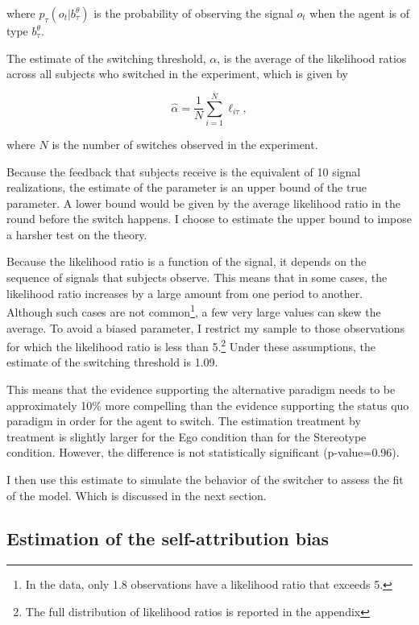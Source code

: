 \documentclass[
  12pt,
]{article}
\begin{document}
where \(p_\tau(o_t|b_{\tau}^\theta)\) is the probability of observing
the signal \(o_t\) when the agent is of type \(b_{\tau}^\theta\).

The estimate of the switching threshold, \(\alpha\), is the average of
the likelihood ratios across all subjects who switched in the
experiment, which is given by

\[\hat{\alpha} = \frac{1}{N}\sum_{i=1}^N \ell_{i\tau},\]

where \(N\) is the number of switches observed in the experiment.

Because the feedback that subjects receive is the equivalent of 10
signal realizations, the estimate of the parameter is an upper bound of
the true parameter. A lower bound would be given by the average
likelihood ratio in the round before the switch happens. I choose to
estimate the upper bound to impose a harsher test on the theory.

Because the likelihood ratio is a function of the signal, it depends on
the sequence of signals that subjects observe. This means that in some
cases, the likelihood ratio increases by a large amount from one period
to another. Although such cases are not
common\footnote{In the data, only 1.8%
observations have a likelihood ratio that exceeds 5.}, a few very large
values can skew the average. To avoid a biased parameter, I restrict my
sample to those observations for which the likelihood ratio is less than
5.\footnote{The full distribution of likelihood ratios is reported in the appendix}
Under these assumptions, the estimate of the switching threshold is
1.09.

This means that the evidence supporting the alternative paradigm needs
to be approximately 10\% more compelling than the evidence supporting
the status quo paradigm in order for the agent to switch. The estimation
treatment by treatment is slightly larger for the Ego condition than for
the Stereotype condition. However, the difference is not statistically
significant (p-value=0.96).

I then use this estimate to simulate the behavior of the switcher to
assess the fit of the model. Which is discussed in the next section.

\hypertarget{estimation-of-the-self-attribution-bias}{%
\subsection{Estimation of the self-attribution
bias}\label{estimation-of-the-self-attribution-bias}}
\end{document}
